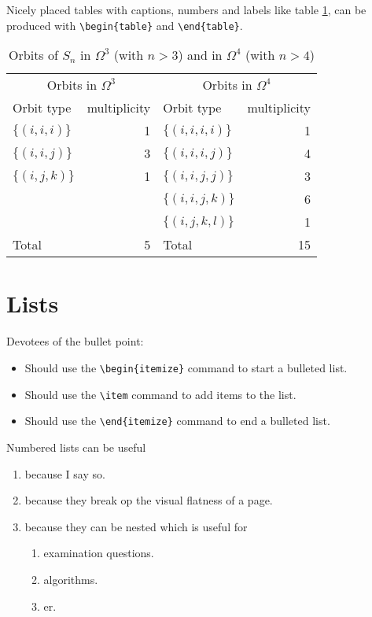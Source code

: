 \documentclass[11pt,a4paper]{article}
\begin{document}
Nicely placed tables with captions, numbers and labels like table \ref{tab:symgrporbits}, can be produced with \verb+\begin{table}+ and \verb+\end{table}+.


\begin{table}[tb]
\caption{Orbits of $S_n$ in $\Omega^3$ (with $n>3$)
and in $\Omega^4$ (with $n>4$)}
\label{tab:symgrporbits}
\begin{center}
\begin{tabular}{lr||lr}
\multicolumn{2}{c}{Orbits in $\Omega^3$}
&
\multicolumn{2}{c}{Orbits in $\Omega^4$} \\
Orbit type & multiplicity & Orbit type& multiplicity\\
\hline
$\{(i,i,i)\}$ & 1 & $\{(i,i,i,i)\}$ & 1 \\
$\{(i,i,j)\}$ & 3 & $\{(i,i,i,j)\}$ & 4 \\
$\{(i,j,k)\}$ & 1 & $\{(i,i,j,j)\}$ & 3 \\
&   & $\{(i,i,j,k)\}$& 6 \\
&   & $\{(i,j,k,l)\}$& 1 \\
\hline
Total        &  5 & Total        &  15
\end{tabular}
\end{center}
\end{table}


\section{Lists}

Devotees of the bullet point:
\begin{itemize}
\item Should use the \verb+\begin{itemize}+ command to start a bulleted list.
\item Should use the \verb+\item+ command to add items to the list.
\item Should use the \verb+\end{itemize}+ command to end a bulleted list.
\end{itemize}

\noindent Numbered lists can be useful
\begin{enumerate}
\item because I say so.
\item because they break op the visual flatness of a page.
\item because they can be nested which is useful for
\begin{enumerate}
\item examination questions.
\item algorithms.
\item er.
\end{enumerate}
\end{enumerate}
\end{document}
